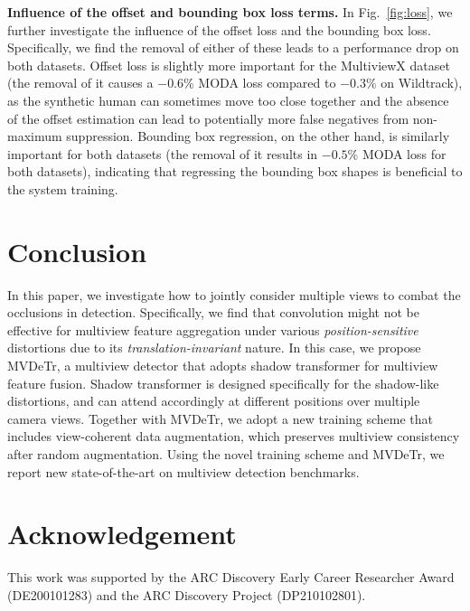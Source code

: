 \documentclass[sigconf,authorversion,nonacm]{acmart}
\begin{document}
\textbf{Influence of the offset and bounding box loss terms.}
In Fig.~\ref{fig:loss}, we further investigate the influence of the offset loss and the bounding box loss. Specifically, we find the removal of either of these leads to a performance drop on both datasets. Offset loss is slightly more important for the MultiviewX dataset (the removal of it causes a $-0.6\%$ MODA loss compared to $-0.3\%$ on Wildtrack), as the synthetic human can sometimes move too close together and the absence of the offset estimation can lead to potentially more false negatives from non-maximum suppression. Bounding box regression, on the other hand, is similarly important for both datasets (the removal of it results in $-0.5\%$ MODA loss for both datasets), indicating that regressing the bounding box shapes is beneficial to the system training. 


\section{Conclusion}
In this paper, we investigate how to jointly consider multiple views to combat the occlusions in detection. Specifically, we find that convolution might not be effective for multiview feature aggregation under various \textit{position-sensitive} distortions due to its \textit{translation-invariant} nature. In this case, we propose MVDeTr, a multiview detector that adopts shadow transformer for multiview feature fusion. Shadow transformer is designed specifically for the shadow-like distortions, and can attend accordingly at different positions over multiple camera views. Together with MVDeTr, we adopt a new training scheme that includes view-coherent data augmentation, which preserves multiview consistency after random augmentation. 
Using the novel training scheme and MVDeTr, we report new state-of-the-art on multiview detection benchmarks. 



\section*{Acknowledgement}
This work was supported by the ARC Discovery Early Career Researcher Award (DE200101283) and the ARC Discovery Project (DP210102801).




\end{document}
